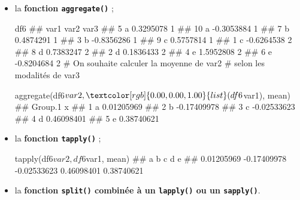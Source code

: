 \documentclass[12pt,twosided, notitlepage]{book}
\newenvironment{Shaded}{}{}
\newcommand{\CommentTok}[1]{\textcolor[rgb]{0.00,0.50,0.00}{#1}}
\newcommand{\KeywordTok}[1]{\textcolor[rgb]{0.00,0.00,1.00}{#1}}
\newcommand{\NormalTok}[1]{#1}
\newcommand{\OperatorTok}[1]{#1}
\renewenvironment{Shaded}{\begin{snugshade}}{\end{snugshade}}
\begin{document}
\begin{itemize}
\item
  la \textbf{fonction
  \texttt{aggregate()}} ;

\begin{Shaded}
\begin{Highlighting}[]
\NormalTok{df6}
\NormalTok{  ##    var1       var2 var3}
\NormalTok{  ## 5     a  0.3295078    1}
\NormalTok{  ## 10    a -0.3053884    1}
\NormalTok{  ## 7     b  0.4874291    1}
\NormalTok{  ## 3     b -0.8356286    1}
\NormalTok{  ## 9     c  0.5757814    1}
\NormalTok{  ## 1     c -0.6264538    2}
\NormalTok{  ## 8     d  0.7383247    2}
\NormalTok{  ## 2     d  0.1836433    2}
\NormalTok{  ## 4     e  1.5952808    2}
\NormalTok{  ## 6     e -0.8204684    2}
\CommentTok{# On souhaite calculer la moyenne de var2}
\CommentTok{# selon les modalités de var3}

\KeywordTok{aggregate}\NormalTok{(df6}\OperatorTok{$}\NormalTok{var2, }\KeywordTok{list}\NormalTok{(df6}\OperatorTok{$}\NormalTok{var1), mean)}
\NormalTok{  ##   Group.1           x}
\NormalTok{  ## 1       a  0.01205969}
\NormalTok{  ## 2       b -0.17409978}
\NormalTok{  ## 3       c -0.02533623}
\NormalTok{  ## 4       d  0.46098401}
\NormalTok{  ## 5       e  0.38740621}
\end{Highlighting}
\end{Shaded}
\item
  la \textbf{fonction \texttt{tapply()}} ;

\begin{Shaded}
\begin{Highlighting}[]
\KeywordTok{tapply}\NormalTok{(df6}\OperatorTok{$}\NormalTok{var2, df6}\OperatorTok{$}\NormalTok{var1, mean)}
\NormalTok{  ##           a           b           c           d           e }
\NormalTok{  ##  0.01205969 -0.17409978 -0.02533623  0.46098401  0.38740621}
\end{Highlighting}
\end{Shaded}
\item
  la \textbf{fonction \texttt{split()} combinée à un \texttt{lapply()}
  ou un
  \texttt{sapply()}}.


\end{itemize}
\end{document}
